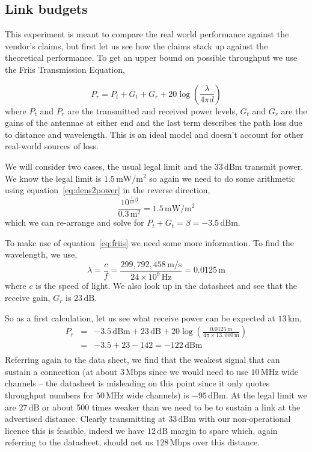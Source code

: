 \subsection{Link budgets}

This experiment is meant to compare the real world performance against
the vendor's claims, but first let us see how the claims stack up
against the theoretical performance. To get an upper bound on possible
throughput we use the Friis Transmission Equation,

\begin{equation}
\label{eq:friis}
  P_r = P_t + G_t + G_r + 20 \log\left(\frac{\lambda}{4\pi d}\right)
\end{equation}
where $P_t$ and $P_r$ are the transmitted and received power levels,
$G_t$ and $G_r$ are the gains of the antennae at either end and the
last term describes the path loss due to distance and wavelength. This
is an ideal model and doesn't account for other real-world sources of
loss.

We will consider two cases, the usual legal limit and the
$33\,\text{dBm}$ transmit power. We know the legal limit is
$1.5\,\text{mW}/\text{m}^2$ so again we need to do some arithmetic
using equation~\ref{eq:dens2power} in the reverse direction,
\begin{equation}
\frac{10^{\frac{1}{10}\beta}}{0.3\,\text{m}^2} = 1.5\,\text{mW}/\text{m}^2
\end{equation}
which we can re-arrange and solve for $P_t + G_t = \beta =
-3.5\,\text{dBm}$.

To make use of equation~\ref{eq:friis} we need some more
information. To find the wavelength, we use,
\begin{equation}
\lambda = \frac{c}{f} = \frac{299,792,458\,\text{m}/\text{s}}{24
  \times 10^9 \,\text{Hz}} = 0.0125\,\text{m}
\end{equation}
where $c$ is the speed of light. We also look up in the datasheet and
see that the receive gain, $G_r$ is $23\,\text{dB}$.

So as a first calculation, let us see what receive power can be
expected at $13\,\text{km}$,
$$
\begin{array}{rcl}
P_r &=& -3.5\,\text{dBm} + 23\,\text{dB} +
20\log\left(\frac{0.0125\,\text{m}}{4\pi \times
  13,000\,\text{m}}\right)\\
    &=& -3.5 + 23 - 142 = -122\,\text{dBm}\\
\end{array}
$$
Referring again to the data sheet, we find that the weakest signal
that can sustain a connection (at about $3\,\text{Mbps}$ since we would
need to use $10\,\text{MHz}$ wide channels -- the datasheet is
misleading on this point since it only quotes throughput numbers for
$50\,\text{MHz}$ wide channels) is
$-95\,\text{dBm}$. At the legal limit we are $27\,\text{dB}$ or about
500 times weaker than we need to be to sustain a link at the
advertised distance. Clearly transmitting at $33\, \text{dBm}$ with
our non-operational licence this is feasible, indeed we have $12\,\text{dB}$
margin to spare which, again referring to the datasheet, should net us
$128\,\text{Mbps}$ over this distance.

